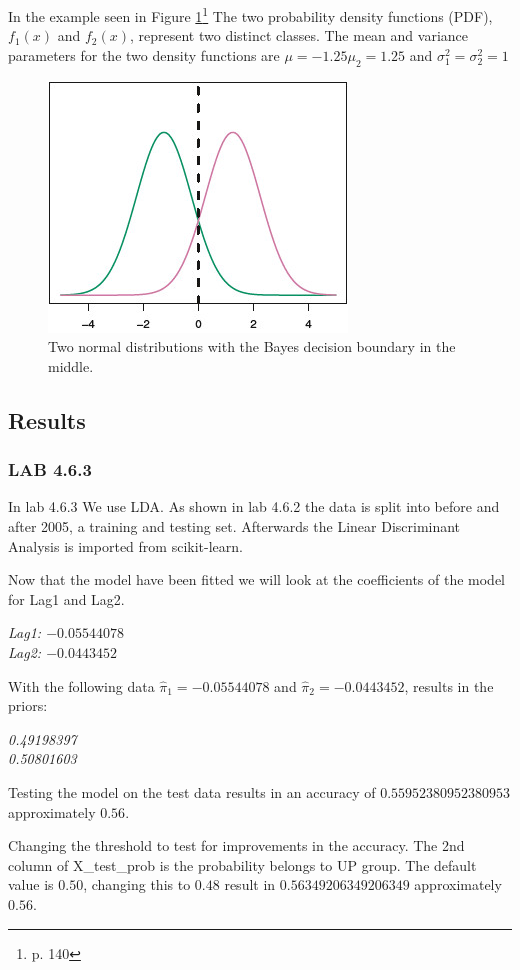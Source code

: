 In the example seen in Figure \ref{fig:TwoOneDimensionalNormalDensityFunctions}\footnote{\cite{James2013} p. 140} The two probability density functions (PDF), $f_1(x)$ and $f_2(x)$, represent two distinct classes. The mean and variance parameters for the two density functions are $\mu=-1.25 \mu_2=1.25$ and $\sigma^2_1=\sigma^2_2=1$
\begin{figure}[h]
	\centering
	\includegraphics[scale=2.0]{discriminantAnalysis/linearDiscriminantAnalysis/fig/TwoOneDimensionalNormalDensityFunctions.jpg}
	\caption{Two normal distributions with the Bayes decision boundary in the middle.}
	\label{fig:TwoOneDimensionalNormalDensityFunctions}
\end{figure}


\subsection{Results}
\subsubsection*{LAB 4.6.3}
In lab 4.6.3 We use LDA. As shown in lab 4.6.2 the data is split into before and after 2005, a training and testing set. Afterwards the Linear Discriminant Analysis is imported from scikit-learn.

Now that the model have been fitted we will look at the coefficients of the model for Lag1 and Lag2.

\noindent\textit{Lag1: $-0.05544078$\\
Lag2: $-0.0443452$}

With the following data $\hat{ \pi }_1 = -0.05544078$ and $\hat{ \pi }_2 = -0.0443452 $, results in the priors:%

\noindent\textit{0.49198397\\
0.50801603}

Testing the model on the test data results in an accuracy of $0.55952380952380953$ approximately $0.56$.

Changing the threshold to test for improvements in the accuracy. The 2nd column of X\_test\_prob is the probability belongs to UP group. The default value is $0.50$, changing this to $0.48$ result in $0.56349206349206349$ approximately $0.56$.
